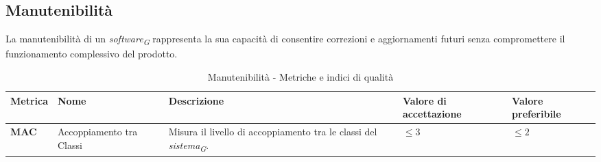 \subsection{Manutenibilità}
La manutenibilità di un \textit{software}\textsubscript{\textit{G}} rappresenta la sua capacità di consentire correzioni e aggiornamenti futuri senza compromettere il funzionamento complessivo del prodotto.  
\begin{table}[H]
    \centering
    \begin{tabular}{|C{1.5cm}|L{3cm}|L{4cm}|L{2.5cm}|L{2.5cm}|}
        \hline
        \textbf{Metrica} & \textbf{Nome} & \textbf{Descrizione} & \textbf{Valore di accettazione} & \textbf{Valore preferibile} \\
        \hline
        \textbf{MAC} & Accoppiamento tra Classi & Misura il livello di accoppiamento tra le classi del \textit{sistema}\textsubscript{\textit{G}}. & $\leq 3$ & $\leq 2$ \\
        \hline
    \end{tabular}
    \caption{Manutenibilità - Metriche e indici di qualità}
    \label{tab:manutenibilità_qualita_prodotto}
\end{table}